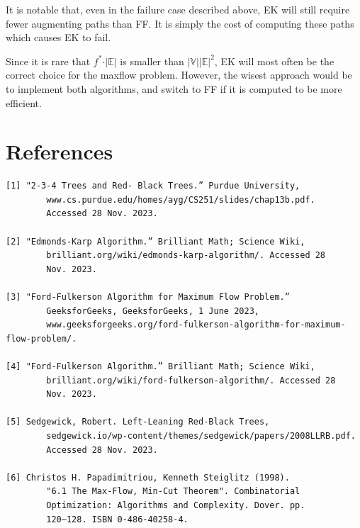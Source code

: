 \documentclass[12pt]{amsart}
\begin{document}
    It is notable that, even in the failure case described
    above, EK will still require fewer augmenting paths than FF.
    It is simply the cost of computing these paths which causes
    EK to fail.

    Since it is rare that $f^* \cdot \vert \mathbb{E} \vert$ is
    smaller than
    $\vert \mathbb{V} \vert \vert \mathbb{E} \vert ^2$, EK will
    most often be the correct choice for the maxflow problem.
    However, the wisest approach would be to implement both
    algorithms, and switch to FF if it is computed to be more
    efficient.

\newpage
\section{References}

\begin{verbatim}
[1] "2-3-4 Trees and Red- Black Trees.” Purdue University,
        www.cs.purdue.edu/homes/ayg/CS251/slides/chap13b.pdf.
        Accessed 28 Nov. 2023. 

[2] "Edmonds-Karp Algorithm.” Brilliant Math; Science Wiki,
        brilliant.org/wiki/edmonds-karp-algorithm/. Accessed 28
        Nov. 2023. 

[3] "Ford-Fulkerson Algorithm for Maximum Flow Problem.”
        GeeksforGeeks, GeeksforGeeks, 1 June 2023,
        www.geeksforgeeks.org/ford-fulkerson-algorithm-for-maximum-flow-problem/. 

[4] "Ford-Fulkerson Algorithm.” Brilliant Math; Science Wiki,
        brilliant.org/wiki/ford-fulkerson-algorithm/. Accessed 28
        Nov. 2023. 

[5] Sedgewick, Robert. Left-Leaning Red-Black Trees,
        sedgewick.io/wp-content/themes/sedgewick/papers/2008LLRB.pdf.
        Accessed 28 Nov. 2023. 

[6] Christos H. Papadimitriou, Kenneth Steiglitz (1998).
        "6.1 The Max-Flow, Min-Cut Theorem". Combinatorial
        Optimization: Algorithms and Complexity. Dover. pp.
        120–128. ISBN 0-486-40258-4.

\end{verbatim}
\end{document}
